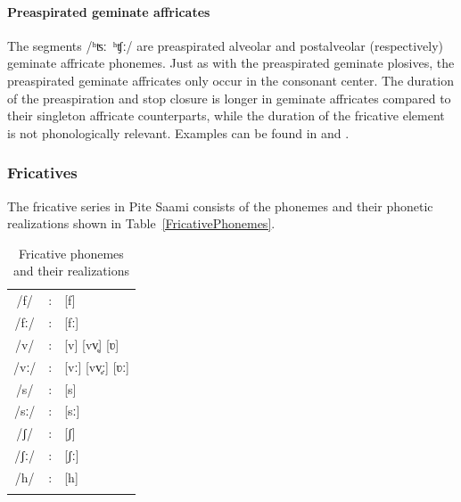 \paragraph{Preaspirated geminate affricates}
The segments \mbox{/ʰʦː ʰʧː/} are preaspirated alveolar and postalveolar (respectively) geminate affricate phonemes. 
Just as with the preaspirated geminate plosives, the preaspirated geminate affricates only occur in the consonant center. The duration of the preaspiration and stop closure is longer in geminate affricates compared to their singleton affricate counterparts, while the duration of the fricative element is not phonologically relevant. 
Examples can be found in  and .

\subsubsection{Fricatives}\label{Fricatives}
The fricative series in Pite Saami consists of the phonemes and their phonetic realizations shown in Table~\vref{FricativePhonemes}. %
\begin{table}[htb]\centering
\caption{Fricative phonemes and their realizations}\label{FricativePhonemes}
\begin{tabular}{c c l}\mytoprule
/f/ &:& [f] \\ %
/fː/ &:& [fː] \\ %
/v/ &:& [v] [vv̥] [ʋ] \\ %
/vː/ &:& [vː] [vv̥ː] [ʋː] \\ %
/s/ &:& [s] \\ %
/sː/ &:& [sː] \\ %
/ʃ/ &:& [ʃ] \\ %
/ʃː/ &:& [ʃː] \\ %
/h/ &:& [h] \\ %
\mybottomrule
\end{tabular}
\end{table}


